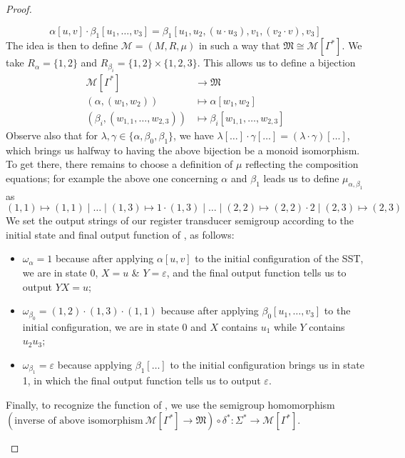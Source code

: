 \documentclass[a4paper,UKenglish,cleveref, autoref, thm-restate, numberwithinsect]{lipics-v2021}
\newcommand{\tito}[1]{\todo[inline,color=green!40]{Tito --- #1}}
\begin{document}
\begin{proof}
\begin{claimproof}
    \[ \alpha[u,v] \cdot \beta_1[u_1,\dots,v_3] = \beta_1[u_1,u_2,(u \cdot u_3),v_1,(v_2 \cdot v),v_3] \]
    The idea is then to define $\mathcal{M} = (M,R,\mu)$ in such a way that $\mathfrak{M} \cong \mathcal{M}[\Gamma^*]$. We take $R_\alpha = \{1,2\}$ and $R_{\beta_i} = \{1,2\} \times \{1,2,3\}$. This allows us to define a bijection
    \begin{align*}
      \mathcal{M}[\Gamma^*] &\to \mathfrak{M}\\
      (\alpha, (w_1, w_2)) &\mapsto \alpha[w_1,w_2]\\
      (\beta_i, (w_{1,1},\dots,w_{2,3})) &\mapsto \beta_i[w_{1,1},\dots,w_{2,3}]
    \end{align*}
    Observe also that for $\lambda,\gamma\in\{\alpha,\beta_0,\beta_1\}$, we have $\lambda[\dots] \cdot \gamma[\dots] = (\lambda\cdot\gamma)[\dots]$, which brings us halfway to having the above bijection be a monoid isomorphism. To get there, there remains to choose a definition of $\mu$ reflecting the composition equations; for example the above one concerning $\alpha$ and $\beta_1$ leads us to define $\mu_{\alpha,\beta_1}$ as
    \[ (1,1)\mapsto(1,1) \mid \dots \mid (1,3) \mapsto 1 \cdot (1,3) \mid \dots \mid (2,2) \mapsto (2,2) \cdot 2 \mid (2,3) \mapsto (2,3) \]
    We set the output strings of our register transducer semigroup according to the initial state and final output function of , as follows:
    \begin{itemize}
      \item $\omega_\alpha = 1$ because after applying $\alpha[u,v]$ to the initial configuration of the SST, we are in state 0, $X = u$ \& $Y = \varepsilon$, and the final output function tells us to output $YX = u$;
      \item $\omega_{\beta_0} = (1,2)\cdot(1,3)\cdot(1,1)$ because after applying $\beta_0[u_1,\dots,v_3]$ to the initial configuration, we are in state 0 and $X$ contains $u_1$ while $Y$ contains $u_2 u_3$;
      \item $\omega_{\beta_1} = \varepsilon$ because applying $\beta_1[\dots]$ to the initial configuration brings us in state 1, in which the final output function tells us to output $\varepsilon$.
    \end{itemize}
    Finally, to recognize the function of , we use the semigroup homomorphism $(\text{inverse of above isomorphism}\ \mathcal{M}[\Gamma^*] \to \mathfrak{M}) \circ \delta^* : \Sigma^* \to \mathcal{M}[\Gamma^*]$.
  \end{claimproof}

  \tito{todo}
\end{proof}
\end{document}

